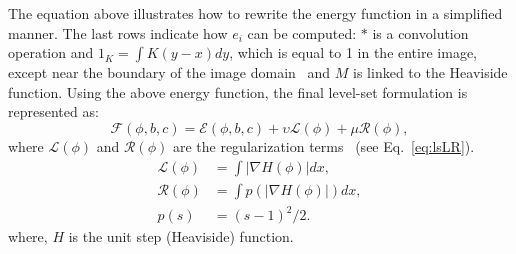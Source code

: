 \begin{description}
\noindent The equation above illustrates how to rewrite the energy function in a simplified manner.
The last rows indicate how $e_{i}$ can be computed: $\ast$ is a convolution operation and $1_{K} = \int K(y-x) dy$, which is equal to 1 in the entire image, except near the boundary of the image domain~\cite{li2011level} and $M$ is linked to the Heaviside function.
Using the above energy function, the final level-set formulation is represented as: 
\begin{equation}
\mathcal{F}(\phi,b,c)= \mathcal{E}(\phi,b,c) + \upsilon\mathcal{L}(\phi) + \mu\mathcal{R}(\phi),
\end{equation}
\noindent where $\mathcal{L}(\phi)$ and $\mathcal{R}(\phi)$ are the regularization terms~\cite{li2011level} (see Eq.~\ref{eq:lsLR}).
\begin{subequations}
\begin{align}
\mathcal{L}(\phi) & = \int \vert \nabla H(\phi) \vert dx, \\
\mathcal{R}(\phi) & = \int p(\vert \nabla H(\phi) \vert) dx,\\
p(s) & = (s-1)^{2}/2.
\end{align}
\label{eq:lsLR}
\end{subequations}
\noindent where, $H$ is the unit step (Heaviside) function.


\end{description}
